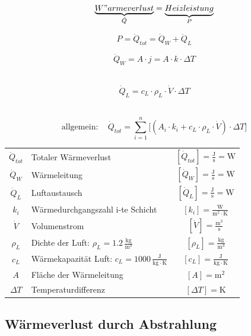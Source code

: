 $$\mathrm{\underbrace{W"armeverlust}_{\substack{\dot{Q}}}  = \underbrace{Heizleistung}_{\substack{P}}  }   $$

$$ \boxed{ P = \dot{Q}_{tot} = \dot{Q}_W + \dot{Q}_L }   $$

\begin{minipage}{0.46\linewidth}
$$ \boxed{ \dot{Q}_W = A \cdot j = A \cdot k \cdot \Delta T  }$$ \\
\end{minipage}
\hfill
\begin{minipage}{0.46\linewidth}
$$ \boxed{ \dot{Q}_L = c_L \cdot \rho_L \cdot \dot{V} \cdot \Delta T}   $$
\\
\end{minipage}



$$ \boxed{ \mathrm{allgemein: } \quad \dot{Q}_{tot} = \sum_{i=1}^n  \big[  (A_i \cdot k_i + c_L \cdot \rho_L \cdot \dot{V} ) \cdot \Delta T \big]  }   $$


\begin{tabular}{c l c}
	\rule{0pt}{10pt}$\dot{Q}_{tot}$ & Totaler Wärmeverlust & $[\dot{Q}_{tot}] = \mathrm{\frac{J}{s} = W}$ \\
	\rule{0pt}{10pt}$\dot{Q}_W$ & Wärmeleitung & $[\dot{Q}_W] = \mathrm{\frac{J}{s} = W}$ \\
	\rule{0pt}{10pt}$\dot{Q}_L$ & Luftaustausch & $[\dot{Q}_L] = \mathrm{\frac{J}{s} = W}$ \\
	\rule{0pt}{10pt}$k_i$ & Wärmedurchgangszahl i-te Schicht & $[k_i] = \mathrm{\frac{W}{m^2 \cdot K}}$ \\
	\rule{0pt}{10pt}$\dot{V}$ & Volumenstrom & $[\dot{V}] = \mathrm{\frac{m^3}{s}}$ \\
	\rule{0pt}{10pt}$\rho_L$ & Dichte der Luft: $\rho_L = 1.2 \, \mathrm{\frac{kg}{m^3}}$ & $[\rho_L] = \mathrm{\frac{kg}{m^3}}$ \\
	\rule{0pt}{10pt}$c_L$ & Wärmekapazität Luft: $c_L = 1000 \, \mathrm{\frac{J}{kg \cdot K}}$ & $[c_L] = \mathrm{\frac{J}{kg \cdot K}}$ \\
	$A$ & Fläche der Wärmeleitung & $[A] = \mathrm{m^2}$ \\
	$\Delta T$ & Temperaturdifferenz & $[\Delta T] = \mathrm{K}$ \\
\end{tabular}



\vfill\null
\columnbreak



\subsection{Wärmeverlust durch Abstrahlung}

